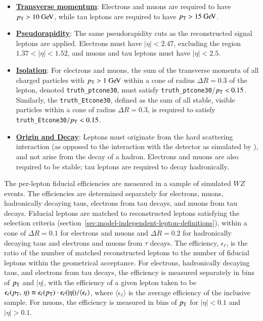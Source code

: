 \begin{itemize}
	\item \underline{\textbf{Transverse momentum}}: Electrons and muons are required to have $\pt>10 \GeV$, while tau leptons are required to have $\pt>15 \GeV$.
	\item \underline{\textbf{Pseudorapidity}}: The same pseudorapidity cuts as the reconstructed signal leptons are applied. Electrons must have $|\eta|<2.47$, excluding the region $1.37<|\eta|<1.52$, and muons and tau leptons must have $|\eta|<2.5$.
	\item \underline{\textbf{Isolation}}: For electrons and muons, the sum of the transverse momenta of all charged particles with $\pt>1 \GeV$ within a cone of radius $\Delta R=0.3$ of the lepton, denoted \texttt{truth\_ptcone30}, must satisfy \texttt{truth\_ptcone30}/$p_{\text{T}}<0.15$. Similarly, the \texttt{truth\_Etcone30}, defined as the sum of all stable, visible particles within a cone of radius $\Delta R=0.3$, is required to satisfy \texttt{truth\_Etcone30}$/p_{\text{T}}<0.15$.
	\item \underline{\textbf{Origin and Decay}}: Leptons must originate from the hard scattering interaction (as opposed to the interaction with the detector as simulated by \geant), and not arise from the decay of a hadron. Electrons and muons are also required to be stable; tau leptons are required to decay hadronically. 
\end{itemize}

The per-lepton fiducial efficiencies are measured in a sample of simulated $WZ$ events. The efficiencies are determined separately for electrons, muons, hadronically decaying taus, electrons from tau decays, and muons from tau decays. Fiducial leptons are matched to reconstructed leptons satisfying the selection criteria (section~\ref{sec:model-independent-lepton-definitions}), within a cone of  $\Delta R=0.1$ for electrons and muons and $\Delta R=0.2$ for hadronically decaying taus and electrons and muons from $\tau$ decays. The efficiency, $\epsilon_{\ell}$, is the ratio of the number of matched reconstructed leptons to the number of fiducial leptons within the geometrical acceptance. For electrons, hadronically decaying taus, and electrons from tau decays, the efficiency is measured separately in bins of $p_{\text{T}}$ and $|\eta|$, with the efficiency of a given lepton taken to be $\epsilon_{\ell}(\pt,\,\eta) \equiv \epsilon_{\ell}(\pt)\cdot\epsilon_{\ell}(|\eta|) / \langle \epsilon_{\ell} \rangle$, where $\langle \epsilon_{\ell} \rangle$ is the average efficiency of the inclusive sample. For muons, the efficiency is measured in bins of $p_{\text{T}}$ for $|\eta|<0.1$ and $|\eta|>0.1$. 


